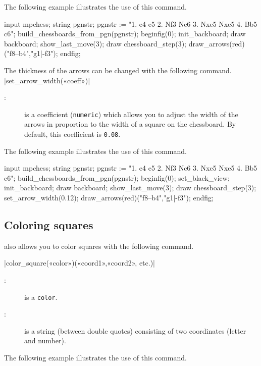 \documentclass[english]{ltxdoc}
\begin{document}
The following example illustrates the use of this command.
\begin{ExempleMP}
input mpchess;
string pgnstr;
pgnstr := "1. e4 e5 2. Nf3 Nc6 3. Nxe5 Nxe5 4. Bb5 c6";
build_chessboards_from_pgn(pgnstr);
beginfig(0);
init_backboard;
draw backboard;
show_last_move(3);
draw chessboard_step(3); %
draw_arrows(red)("f8--b4","g1|-f3");
endfig;
\end{ExempleMP}

The thickness of the arrows can be changed with the following command.
\commande|set_arrow_width(«coeff»)|\smallskip

\begin{description}
  \item[:] is a coefficient (\lstinline+numeric+) which allows you 
  to adjust the width of the arrows in proportion to the width of a square on the chessboard. By default, this coefficient is \lstinline+0.08+.
\end{description}

The following example illustrates the use of this command.
\begin{ExempleMP}
input mpchess;
string pgnstr;
pgnstr := "1. e4 e5 2. Nf3 Nc6 3. Nxe5 Nxe5 4. Bb5 c6";
build_chessboards_from_pgn(pgnstr);
beginfig(0);
set_black_view;
init_backboard;
draw backboard;
show_last_move(3);
draw chessboard_step(3); %
set_arrow_width(0.12);
draw_arrows(red)("f8--b4","g1|-f3");
endfig;
\end{ExempleMP}

\subsection{Coloring squares}

\mpchess also allows you to color squares with the following command.

\commande|color_square(«color»)(«coord1»,«coord2», etc.)|\smallskip

\begin{description}
\item[:] is a \MP{} \lstinline+color+.
\item[:] is a string (between double quotes) consisting of two
coordinates (letter and number). 
\end{description}

The following example illustrates the use of this command.
\end{document}
